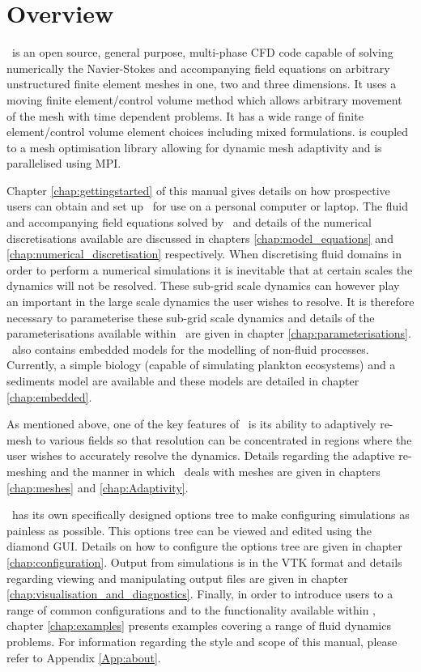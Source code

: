 \chapter*{Overview}

\fluidity\ is an open source, general purpose, multi-phase CFD code capable of solving numerically the Navier-Stokes and accompanying field equations on arbitrary unstructured finite element meshes in one, two and three dimensions. It uses a moving finite element/control volume method which allows arbitrary movement of the mesh with time dependent problems. It has a wide range of finite element/control volume element choices including mixed formulations. \fluidity is coupled to a mesh optimisation library allowing for dynamic mesh adaptivity and is parallelised using MPI.

Chapter \ref{chap:gettingstarted} of this manual gives details on how prospective users can obtain and set up \fluidity\ for use on a personal computer or laptop. The fluid and accompanying field equations solved by \fluidity\ and details of the numerical discretisations available are discussed in chapters \ref{chap:model_equations} and \ref{chap:numerical_discretisation} respectively. When discretising fluid domains in order to perform a numerical simulations it is inevitable that at certain scales the dynamics will not be resolved. These sub-grid scale dynamics can however play an important in the large scale dynamics the user wishes to resolve. It is therefore necessary to parameterise these sub-grid scale dynamics and details of the parameterisations available within \fluidity\ are given in chapter \ref{chap:parameterisations}. \fluidity\ also contains embedded models for the modelling of non-fluid processes. Currently, a simple biology (capable of simulating plankton ecosystems) and a sediments model are available and these models are detailed in chapter \ref{chap:embedded}.

As mentioned above, one of the key features of \fluidity\ is its ability to adaptively re-mesh to various fields so that resolution can be concentrated in regions where the user wishes to accurately resolve the dynamics. Details regarding the adaptive re-meshing and the manner in which \fluidity\ deals with meshes are given in chapters \ref{chap:meshes} and \ref{chap:Adaptivity}.

\fluidity\ has its own specifically designed options tree to make configuring simulations as painless as possible. This options tree can be viewed and edited using the diamond GUI. Details on how to configure the options tree are given in chapter \ref{chap:configuration}. Output from simulations is in the VTK format and details regarding viewing and manipulating output files are given in chapter \ref{chap:visualisation_and_diagnostics}. Finally, in order to introduce users to a range of common configurations and to the functionality available within \fluidity, chapter \ref{chap:examples} presents examples covering a range of fluid dynamics problems. For information regarding the style and scope of this manual, please refer to Appendix \ref{App:about}.
